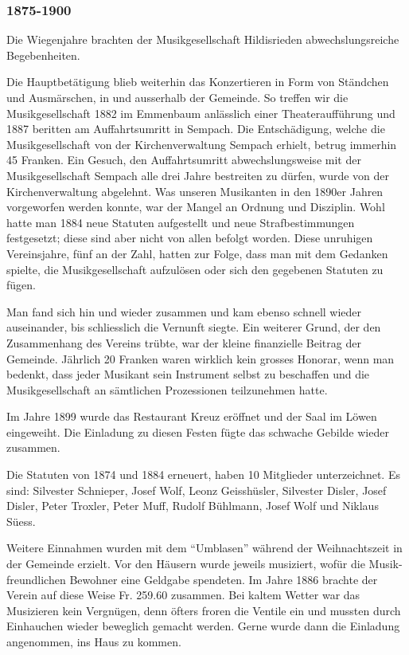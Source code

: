 \begin{history}

    \subsubsection*{1875-1900}

    Die Wiegenjahre brachten der Musikgesellschaft Hildisrieden
    abwechslungsreiche Begebenheiten.

    Die Hauptbetätigung blieb weiterhin das Konzertieren in Form von Ständchen
    und Ausmärschen, in und ausserhalb der Gemeinde. So treffen wir die
    Musikgesellschaft 1882 im Emmenbaum anlässlich einer Theateraufführung und
    1887 beritten am Auffahrtsumritt in Sempach. Die Entschädigung, welche die
    Musikgesellschaft von der Kirchenverwaltung Sempach erhielt, betrug immerhin
    45 Franken. Ein Gesuch, den Auffahrtsumritt abwechslungsweise mit der
    Musikgesellschaft Sempach alle drei Jahre bestreiten zu dürfen, wurde von
    der Kirchenverwaltung abgelehnt. Was unseren Musikanten in den 1890er Jahren
    vorgeworfen werden konnte, war der Mangel an Ordnung    und Disziplin. Wohl
    hatte man 1884 neue Statuten aufgestellt und neue Strafbestimmungen
    festgesetzt; diese sind aber nicht von allen befolgt worden. Diese unruhigen
    Vereinsjahre, fünf an der Zahl, hatten zur Folge, dass man mit dem Gedanken
    spielte, die Musikgesellschaft aufzulösen oder sich den gegebenen Statuten
    zu fügen.

    Man fand sich hin und wieder zusammen und kam ebenso schnell wieder
    auseinander, bis schliesslich die Vernunft siegte. Ein weiterer Grund, der
    den Zusammenhang des Vereins trübte, war der kleine finanzielle Beitrag der
    Gemeinde. Jährlich 20 Franken waren wirklich kein grosses Honorar, wenn man
    bedenkt, dass jeder Musikant sein Instrument selbst zu beschaffen und die
    Musikgesellschaft an sämtlichen Prozessionen teilzunehmen hatte.

    Im Jahre 1899 wurde das Restaurant Kreuz eröffnet und der Saal im Löwen
    eingeweiht. Die Einladung zu diesen Festen fügte das schwache Gebilde wieder
    zusammen.

    Die Statuten von 1874 und 1884 erneuert, haben 10 Mitglieder unterzeichnet.
    Es sind: Silvester Schnieper, Josef Wolf, Leonz Geisshüsler, Silvester
    Disler, Josef Disler, Peter Troxler, Peter Muff, Rudolf Bühlmann, Josef Wolf
    und Niklaus Süess.

    Weitere Einnahmen wurden mit dem \enquote{Umblasen}  während der
    Weihnachtszeit in der Gemeinde erzielt. Vor den Häusern wurde jeweils
    musiziert, wofür die Musik-freundlichen Bewohner eine Geldgabe spendeten. Im
    Jahre 1886 brachte der Verein auf diese Weise Fr. 259.60 zusammen. Bei
    kaltem Wetter war das Musizieren kein Vergnügen, denn öfters froren die
    Ventile ein und mussten durch Einhauchen wieder beweglich gemacht werden.
    Gerne wurde dann die Einladung angenommen, ins Haus zu kommen.


\end{history}
